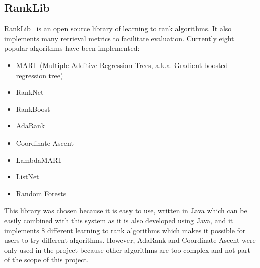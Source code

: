 \subsection{RankLib}\label{section:rankLib}
RankLib~\cite{ranklib} is an open source library of learning to rank algorithms. It also implements many retrieval metrics to facilitate evaluation.
Currently eight popular algorithms have been implemented:
\begin{itemize}
 \item MART (Multiple Additive Regression Trees, a.k.a. Gradient boosted regression tree)
 \item RankNet
 \item RankBoost
 \item AdaRank
 \item Coordinate Ascent
 \item LambdaMART
 \item ListNet
 \item Random Forests
\end{itemize}

This library was chosen because it is easy to use, written in Java which can be easily combined with this system as it is also developed using Java, and
it implements 8 different learning to rank algorithms which makes it possible for users to try different algorithms.
However, AdaRank and Coordinate Ascent were only used in the project because other algorithms are too complex and not part of the scope of this project.

